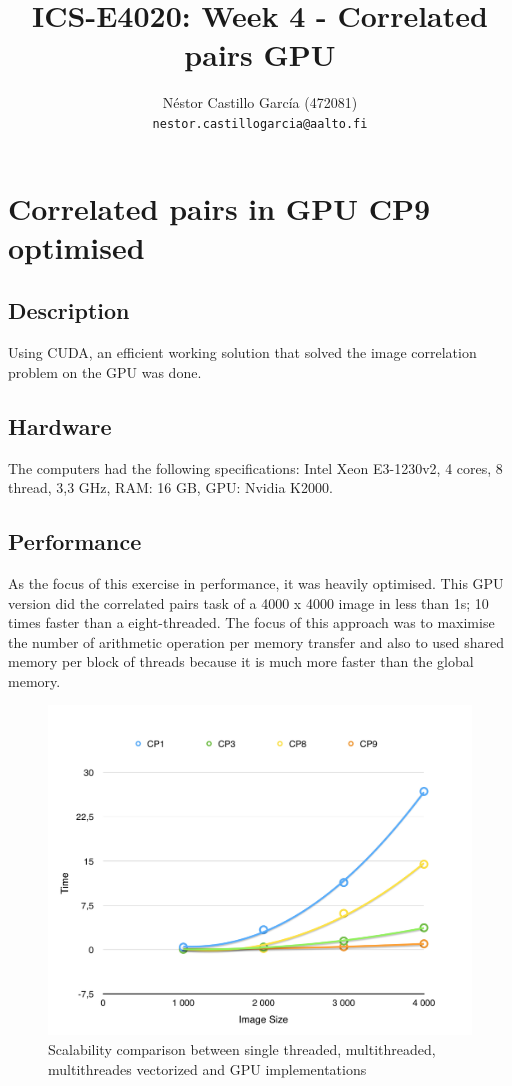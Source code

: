 \documentclass[a4paper,10pt]{article}
\title{ICS-E4020: Week 4 - Correlated pairs GPU}
\author{Néstor Castillo García (472081)\\ 
       {\tt nestor.castillogarcia@aalto.fi}}
\begin{document}
\maketitle

\section{Correlated pairs in GPU CP9 optimised}

\subsection{Description}

Using CUDA, an efficient working solution that solved the image correlation problem on the GPU was done.


\subsection{Hardware}
The computers had the following specifications: Intel Xeon E3-1230v2, 4 cores, 8 thread, 3,3 GHz, RAM: 16 GB, GPU: Nvidia K2000.

\subsection{Performance}
As the focus of this exercise in performance, it was heavily optimised. This GPU version did the correlated pairs task of a 4000 x 4000 image in less than 1s; 10 times faster than a eight-threaded. The focus of this approach was to maximise the number of arithmetic operation per memory transfer and also to used shared memory per block of threads because it is much more faster than the global memory. 



\begin{figure}[H]
\centering
\includegraphics[width=1\textwidth]{figures/w5-comparison}
\caption{Scalability comparison between single threaded, multithreaded, multithreades vectorized and GPU implementations}
\label{fig:pca_type}
\end{figure}
\end{document}
